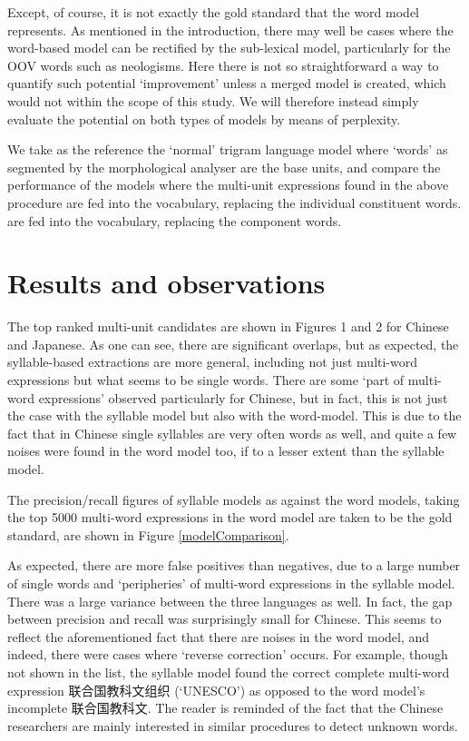\documentclass{article}
\newcommand\Chinese{\CJKfamily{zhrm}\CJKnospace}
\begin{document}
Except, of course, it is not exactly the gold standard that the word model represents. As mentioned in the introduction, there may well be cases where the word-based model can be rectified by the sub-lexical model, particularly for the OOV words such as neologisms. Here there is not so straightforward a way to quantify such potential `improvement' unless a merged model is created, which would not within the scope of this study. We will therefore instead simply evaluate the potential on both types of models by means of perplexity. 

We take as the reference the `normal' trigram language model where `words' as segmented by the morphological analyser are the base units, and compare the performance of the models where the multi-unit expressions found in the above procedure are fed into the vocabulary, replacing the individual constituent words.  are fed into the vocabulary, replacing the component words. 

 
\section{Results and observations}


The top ranked multi-unit candidates are shown in Figures 1 and 2 for Chinese and Japanese. As one can see, there are significant overlaps, but as expected, the syllable-based extractions are more general, including not just multi-word expressions but what seems to be single words. There are some `part of multi-word expressions' observed particularly for Chinese, but in fact, this is not just the case with the syllable model but also with the word-model. This is due to the fact that in Chinese single syllables are very often words as well, and quite a few noises were found in the word model too, if to a lesser extent than the syllable model.

The precision/recall figures of syllable models as against the word models, taking the top 5000 multi-word expressions in the word model are taken to be the gold standard, are shown in Figure \ref{modelComparison}.


As expected, there are more false positives than negatives, due to a large number of single words and `peripheries' of multi-word expressions in the syllable model. There was a large variance between the three languages as well. In fact, the gap between precision and recall was surprisingly small for Chinese. This seems to reflect the aforementioned fact that there are noises in the word model, and indeed, there were cases where `reverse correction' occurs. For example, though not shown in the list, the syllable model found the correct complete multi-word expression {\Chinese 联合国教科文组织} (`UNESCO') as opposed to the word model's incomplete {\Chinese 联合国教科文}. The reader is reminded of the fact that the Chinese researchers are mainly interested in similar procedures to detect unknown words.
\end{document}
